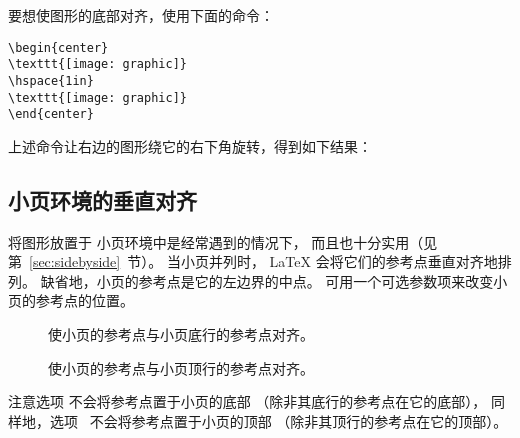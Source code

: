 要想使图形的底部对齐，使用下面的命令：
\begin{lstlisting}
\begin{center}
\texttt{[image: graphic]}
\hspace{1in}
\texttt{[image: graphic]}
\end{center}
\end{lstlisting}
上述命令让右边的图形绕它的右下角旋转，得到如下结果：
\begin{center}
	\resizebox{1in}{!}{\usebox{\boxgraphic}}
	\hspace{1in}
\end{center}

\subsection{小页环境的垂直对齐}\label{ssec:minivalign}

将图形放置于  小页环境中是经常遇到的情况下，
而且也十分实用（见第~\ref{sec:sidebyside}~节）。
当小页并列时， \LaTeX{} 会将它们的参考点垂直对齐地排列。
缺省地，小页的参考点是它的左边界的中点。
可用一个可选参数项来改变小页的参考点的位置。
\begin{description}
	\item[\opt{[b]}] 使小页的参考点与小页底行的参考点对齐。
	\item[\opt{[t]}] 使小页的参考点与小页顶行的参考点对齐。
\end{description}

注意选项 \opt{[b]} 不会将参考点置于小页的底部
（除非其底行的参考点在它的底部），
同样地，选项 \opt{[t]}~不会将参考点置于小页的顶部
（除非其顶行的参考点在它的顶部）。

